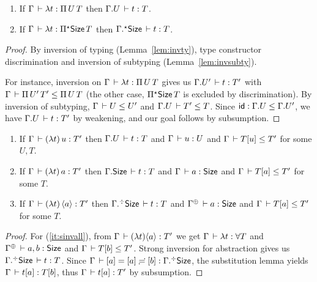 \documentclass[acmlarge,review,anonymous]{acmart}\settopmatter{printfolios=true}
\begin{document}
\begin{lemma}
  \label{lem:invabs}
  \bla
  \begin{enumerate}
  \item   If\/ $\Gamma \,\vdash \lambda t : \Pi\,U\, T$ then
  $\Gamma. U \,\vdash t : T$.
  \item   If\/ $\Gamma \,\vdash \lambda t : \Pi{}^{\mathord{\star}}\mathsf{Size}\, T$ then
  $\Gamma.{}^{\mathord{\star}}\mathsf{Size} \,\vdash t : T$.
  \end{enumerate}
\end{lemma}
\begin{proof}
  By inversion of typing (Lemma~\ref{lem:invty}), type constructor discrimination \label{lem:discr}
  and inversion of subtyping (Lemma~\ref{lem:invsubty}).

  For instance, inversion on $\Gamma \,\vdash \lambda t : \Pi\,U\, T$ gives us $\Gamma. {U'} \,\vdash t : {T'}$ with $\Gamma \,\vdash \Pi\,U'\,{T'} \leq \Pi\,U\, T$ (the other case, $\Pi{}^{\mathord{\star}}\mathsf{Size}\, T$ is excluded by discrimination).  By inversion of subtyping, $\Gamma \,\vdash U \leq U'$ and $\Gamma. {U} \,\vdash T' \leq T$.  Since $\mathsf{id} : \Gamma. U \leq \Gamma. {U'}$, we have $\Gamma. U \,\vdash t : T'$ by weakening, and our goal follows by subsumption.
\end{proof}

\begin{lemma}
  \label{lem:stronginv}
  \bla
  \begin{enumerate}
  \item   If\/ $\Gamma \,\vdash (\lambda t)\,u : T'$ then
  $\Gamma. U \,\vdash t : T$ and $\Gamma \,\vdash u : U$ and $\Gamma \,\vdash T[u] \leq T'$
  for some $U,T$.
  \item   If\/ $\Gamma \,\vdash (\lambda t)\,a : T'$ then
  $\Gamma. \mathsf{Size} \,\vdash t : T$ and $\Gamma \,\vdash a : \mathsf{Size}$ and $\Gamma \,\vdash T[a] \leq T'$
  for some $T$.
  \item \label{it:sinvall}
  If\/ $\Gamma \,\vdash (\lambda t)\,\langle a\rangle : T'$ then
  $\Gamma.{}^{\mathord{\div}}\mathsf{Size} \,\vdash t : T$ and $\resurrect \Gamma \der a : \Size$ and $\Gamma \,\vdash T[a] \leq T'$
  for some $T$.
  \end{enumerate}
\end{lemma}
\begin{proof}
  For (\ref{it:sinvall}), from $\Gamma \,\vdash (\lambda t) \langle a\rangle : T'$ we get $\Gamma \,\vdash \lambda t : \forall T$ and $\resurrect \Gamma \der a,b : \Size$ and $\Gamma \,\vdash T[b] \leq T'$.  Strong inversion for abstraction gives us $\Gamma.{}^{\mathord{\div}}\mathsf{Size} \,\vdash t : T$.  Since $\Gamma \,\vdash [a] = [a] \risingdotseq [b] : \Gamma.{}^{\mathord{\div}}\mathsf{Size}$,  the substitution lemma yields
$\Gamma \,\vdash t[a] : T[b]$, thus $\Gamma \,\vdash t[a] : T'$ by subsumption.
\end{proof}
\end{document}
